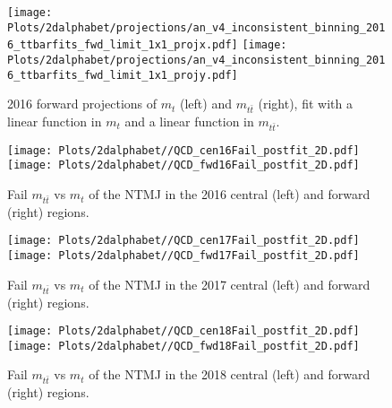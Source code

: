 \begin{figure}[htp]
	\begin{center}
		
		\texttt{[image: Plots/2dalphabet/projections/an\_v4\_inconsistent\_binning\_2016\_ttbarfits\_fwd\_limit\_1x1\_projx.pdf]}
		\texttt{[image: Plots/2dalphabet/projections/an\_v4\_inconsistent\_binning\_2016\_ttbarfits\_fwd\_limit\_1x1\_projy.pdf]}
		\caption{2016 forward projections of $m_t$ (left) and $m_{t\bar{t}}$ (right), fit with a linear function in $m_t$ and a linear function in $m_{t\bar{t}}$.}
		\label{fig:2016fwd_proj}
	\end{center}
\end{figure}


\begin{figure}[!htbp]
	\begin{center}
		\texttt{[image: Plots/2dalphabet//QCD\_cen16Fail\_postfit\_2D.pdf]}
		\texttt{[image: Plots/2dalphabet//QCD\_fwd16Fail\_postfit\_2D.pdf]}	
		
		\caption{Fail $m_{t\bar{t}}$ vs $m_t$ of the NTMJ in the 2016 central (left) and forward (right) regions.}
		\label{fig:prefit_closure_2016}
	\end{center}
\end{figure}

\begin{figure}[!htbp]
	\begin{center}
		\texttt{[image: Plots/2dalphabet//QCD\_cen17Fail\_postfit\_2D.pdf]}
		\texttt{[image: Plots/2dalphabet//QCD\_fwd17Fail\_postfit\_2D.pdf]}	
		
		\caption{Fail $m_{t\bar{t}}$ vs $m_t$ of the NTMJ in the 2017 central (left) and forward (right) regions.}
		\label{fig:prefit_closure_2017}
	\end{center}
\end{figure}


\begin{figure}[!htbp]
	\begin{center}
		\texttt{[image: Plots/2dalphabet//QCD\_cen18Fail\_postfit\_2D.pdf]}
		\texttt{[image: Plots/2dalphabet//QCD\_fwd18Fail\_postfit\_2D.pdf]}		
		\caption{Fail $m_{t\bar{t}}$ vs $m_t$ of the NTMJ in the 2018 central (left) and forward (right) regions.}
		\label{fig:prefit_closure_2018}
	\end{center}
\end{figure}





